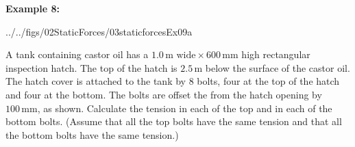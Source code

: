 \documentclass[10pt,onesided]{amsart}
\begin{document}
\newpage
\begin{minipage}[t]{0.45\textwidth}
	\textbf{Example 8:}
	\parb
	\raggedright
	
	\begin{cfig}[0.65]{../../figs/02StaticForces/03staticforcesEx09a}\end{cfig}
	A tank containing castor oil has a $1.0\,\text{m wide}\times 600 \,\text{mm}$ high rectangular inspection hatch.\parb
	The top of the hatch is $2.5\,\text{m}$ below the surface of the castor oil. The hatch cover is attached to
	the tank by $8$ bolts, four at the top of the hatch and four at the bottom.\parb
	The bolts are offset the from the hatch opening by 	$100\,\text{mm}$, as shown.\parb
	Calculate the tension in each of the top and in each of the bottom bolts.\parb
	(Assume that all the top bolts have the same tension and that all the bottom bolts have the same tension.)
\end{minipage}
\end{document}
